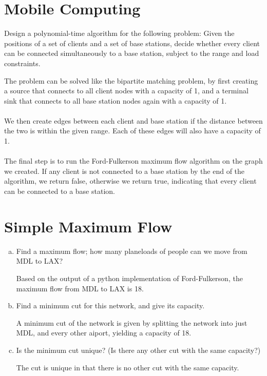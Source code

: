 \documentclass[12pt]{article}
\begin{document}
\maketitle

\section{Mobile Computing}\label{mobile computing}
Design a polynomial-time algorithm for the following problem: Given the positions of a set of clients and a set of base stations, decide whether every client can be connected simultaneously to a base station, subject to the range and load constraints. \\
\begin{addmargin}[2em]{2em}
The problem can be solved like the bipartite matching problem, by first creating a source that connects to all client nodes with a capacity of 1, and a terminal sink that connects to all base station nodes again with a capacity of 1. \\ \\
We then create edges between each client and base station if the distance between the two is within the given range. Each of these edges will also have a capacity of 1. \\ \\
The final step is to run the Ford-Fulkerson maximum flow algorithm on the graph we created. If any client is not connected to a base station by the end of the algorithm, we return false, otherwise we return true, indicating that every client can be connected to a base station.
\end{addmargin}

\section{Simple Maximum Flow}\label{max flow}
\begin{enumerate}[(a)]
\item Find a maximum flow; how many planeloads of people can we move from MDL to LAX?
\begin{addmargin}[2em]{2em}
Based on the output of a python implementation of Ford-Fulkerson, the maximum flow from MDL to LAX is 18.
\end{addmargin}
\item Find a minimum cut for this network, and give its capacity.
\begin{addmargin}[2em]{2em}
A minimum cut of the network is given by splitting the network into just MDL, and every other aiport, yielding a capacity of 18.
\end{addmargin}
\item Is the minimum cut unique? (Is there any other cut with the same capacity?)
\begin{addmargin}[2em]{2em}
The cut is unique in that there is no other cut with the same capacity.
\end{addmargin}
\end{enumerate}
\end{document}

